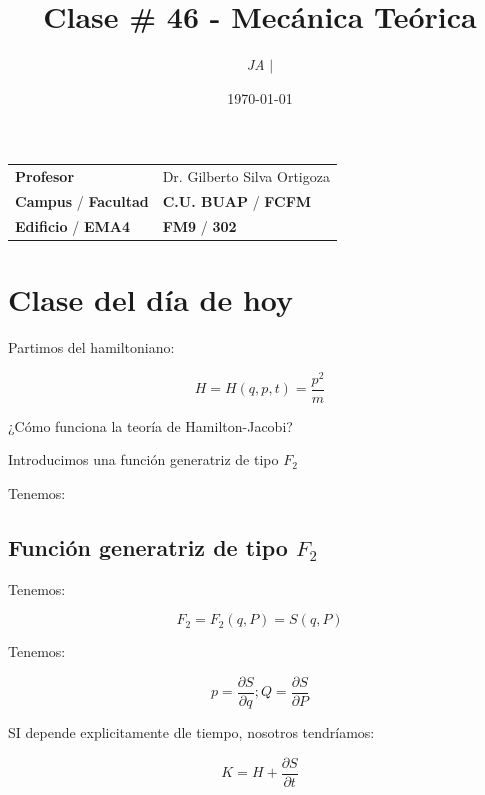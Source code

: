\documentclass{article}
\title{Clase \# 46 - Mecánica Teórica}
\author{\emph{JA} $\boldsymbol{\mid}$}
\date{\today}
\begin{document}
\maketitle



\begin{mybox}
\noindent\begin{tabular}{@{}ll}
	{\bfseries{Profesor}} & Dr. Gilberto Silva Ortigoza\\
	\textcolor{prussianblue}{\bfseries{Campus}} / \textcolor{trueblue}{\bfseries{Facultad}}  & \textcolor{prussianblue}{\bfseries{C.U. BUAP}} /  \textcolor{trueblue}{\bfseries{FCFM}} \\
	\textcolor{prussianblue}{\bfseries{Edificio}} /  \textcolor{trueblue}{\bfseries{EMA4}}    & 	\textcolor{prussianblue}{\bfseries{FM9}} /  \textcolor{trueblue}{\bfseries{302}}   
\end{tabular} 
\end{mybox} \vspace{1cm}

\tableofcontents

\vspace{2cm}

\section{Clase del día de hoy}

Partimos del hamiltoniano:

\[  H= H(q,p,t) = \frac{p^{2}}{m}  \]


¿Cómo funciona la teoría de Hamilton-Jacobi? 

Introducimos una función generatriz de tipo $F_{2}$

Tenemos:


\subsection{Función generatriz de tipo $F_{2}$}


Tenemos:


\[ F_{2} = F_{2}(q,P) = S(q,P)  \]



Tenemos:


\[ p = \frac{\partial S}{\partial q}; Q=\frac{\partial S}{\partial P}   \]


SI depende explicitamente dle tiempo, nosotros tendríamos:


\[  K = H + \frac{\partial S}{\partial t}    \]
\end{document}
